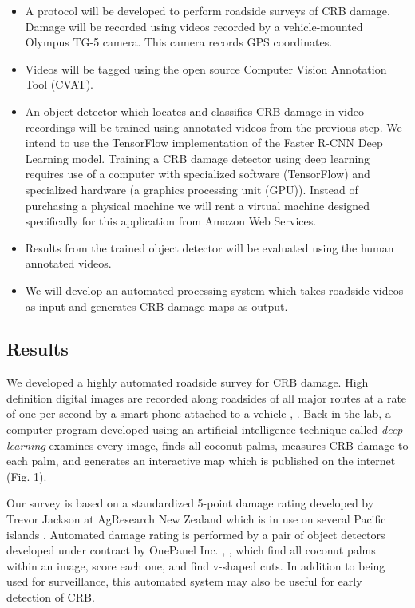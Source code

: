 \documentclass[12pt,letterpaper,english,bibliography=totocnumbered,abstract=on]{scrartcl}
\begin{document}
\begin{framed}
\begin{itemize}
	\item A protocol will be developed to perform roadside surveys of CRB damage. Damage will be recorded using videos recorded by a vehicle-mounted Olympus TG-5 camera. This camera records GPS coordinates.
	\item Videos will be tagged using the open source Computer Vision Annotation Tool (CVAT).
	\item An object detector which locates and classifies CRB damage in video recordings will be trained using annotated videos from the previous step. We intend to use the TensorFlow implementation of the Faster R-CNN Deep Learning model. Training a CRB damage detector using deep learning requires use of a computer with specialized software (TensorFlow) and specialized hardware (a graphics processing unit (GPU)). Instead of purchasing a physical machine we will rent a virtual machine designed specifically for this application from Amazon Web Services.
	\item Results from the trained object detector will be evaluated using the human annotated videos.
	\item We will develop an automated processing system which takes roadside videos as input and generates CRB damage maps as output.
\end{itemize}
\end{framed}

\subsection{Results}

We developed a highly automated roadside survey for CRB damage.
High definition digital images are recorded along roadsides of all major routes at a rate of one per second by a smart phone attached to a vehicle \cite{mooreSetAutomatedRoadside2020}, \cite{mooreYouTubeVideoMounting2020}. Back in the lab, a computer program developed using an artificial intelligence technique called \emph{deep learning} examines every image, finds all coconut palms, measures CRB damage to each palm, and generates an interactive map which is published on the internet (Fig. 1).

Our survey is based on a standardized 5-point damage rating developed by Trevor Jackson at AgResearch New Zealand which is in use on several Pacific islands \cite{mooreAutomatedRoadsideVideo2020}. Automated damage rating is performed by a pair of object detectors developed under contract by OnePanel Inc. \cite{mooreRequestInterestObject2020}, \cite{onepanelinc.ScopeWorkObject2020}, \cite{onepanelinc.AIPipelineOperations2020} which find all coconut palms within an image, score each one, and find v-shaped cuts. In addition to being used for surveillance, this automated system may also be useful for early detection of CRB.
\end{document}
